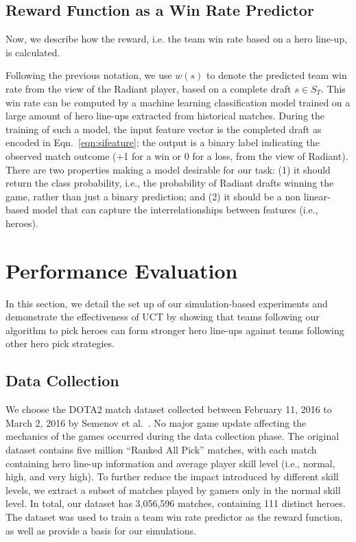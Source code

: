 \subsection{Reward Function as a Win Rate Predictor}\label{sec:rewardfunction}
Now, we describe how the reward, i.e. the team win rate based on a hero line-up, is calculated. 

Following the previous notation, we use $w(s)$ to denote the predicted team win rate from the view of the Radiant player, based on a complete draft $s \in S_T$. This win rate can be computed by a machine learning classification model trained on a large amount of hero line-ups extracted from historical matches. During the training of such a model, the input feature vector is the completed draft as encoded in Eqn.~\ref{eqn:sifeature}; the output is a binary label indicating the observed match outcome (+1 for a win or 0 for a loss, from the view of Radiant). There are two properties making a model desirable for our task: (1) it should return the class probability, i.e., the probability of Radiant drafts winning the game, rather than just a binary prediction; and (2) it should be a non linear-based model that can capture the interrelationships between features (i.e., heroes). 


\section{Performance Evaluation}\label{ressection}
In this section, we detail the set up of our simulation-based experiments and demonstrate the effectiveness of UCT by showing that teams following our algorithm to pick heroes can form stronger hero line-ups against teams following other hero pick strategies.

\subsection{Data Collection}
We choose the DOTA2 match dataset collected between February 11, 2016 to March 2, 2016 by Semenov et al.~\cite{Semenov2016}. No major game update affecting the mechanics of the games occurred during the data collection phase. The original dataset contains five million ``Ranked All Pick'' matches, with each match containing hero line-up information and average player skill level (i.e., normal, high, and very high). To further reduce the impact introduced by different skill levels, 
we extract a subset of matches played by gamers only in the normal skill level. In total, our dataset has 3,056,596 matches, containing 111 distinct heroes. The dataset was used to train a team win rate predictor as the reward function, as well as provide a basis for our simulations.

